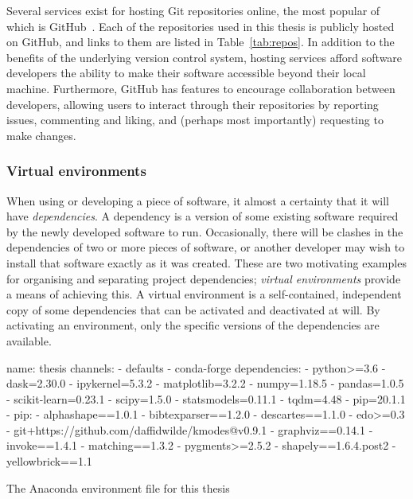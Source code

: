 Several services exist for hosting Git repositories online, the most popular of
which is GitHub~\cite{github}. Each of the repositories used in this thesis is
publicly hosted on GitHub, and links to them are listed in
Table~\ref{tab:repos}. In addition to the benefits of the underlying version
control system, hosting services afford software developers the ability to make
their software accessible beyond their local machine. Furthermore, GitHub has
features to encourage collaboration between developers, allowing users to
interact through their repositories by reporting issues, commenting and
liking, and (perhaps most importantly) requesting to make changes.

\subsubsection{Virtual environments}

When using or developing a piece of software, it almost a certainty that it will
have \emph{dependencies}. A dependency is a version of some existing software
required by the newly developed software to run. Occasionally, there will be
clashes in the dependencies of two or more pieces of software, or another
developer may wish to install that software exactly as it was created. These are
two motivating examples for organising and separating project dependencies;
\emph{virtual environments} provide a means of achieving this. A virtual
environment is a self-contained, independent copy of some dependencies that can
be activated and deactivated at will. By activating an environment, only the
specific versions of the dependencies are available.

\begin{listing}[htbp]
\begin{sourceyml}
name: thesis
channels:
- defaults
- conda-forge
dependencies:
 - python>=3.6
 - dask=2.30.0
 - ipykernel=5.3.2
 - matplotlib=3.2.2
 - numpy=1.18.5
 - pandas=1.0.5
 - scikit-learn=0.23.1
 - scipy=1.5.0
 - statsmodels=0.11.1
 - tqdm=4.48
 - pip=20.1.1
 - pip:
   - alphashape==1.0.1
   - bibtexparser==1.2.0
   - descartes==1.1.0
   - edo>=0.3
   - git+https://github.com/daffidwilde/kmodes@v0.9.1
   - graphviz==0.14.1
   - invoke==1.4.1
   - matching==1.3.2
   - pygments>=2.5.2
   - shapely==1.6.4.post2
   - yellowbrick==1.1
\end{sourceyml}
\caption{The Anaconda environment file for this thesis}\label{snp:environment}
\end{listing}

